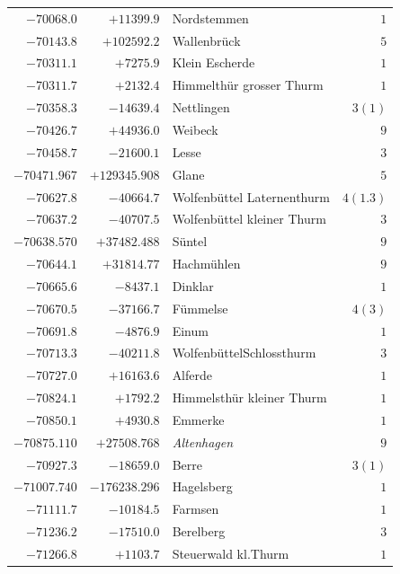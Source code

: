 \begin{center}
\begin{tabular}{r|r|p{170pt}|r}
\(-70068.0\)&\(+11399.9\)&Nordstemmen&\(1\)\\
\(-70143.8\)&\(+102592.2\)&Wallenbrück&\(5\)\\
\(-70311.1\)&\(+7275.9\)&Klein Escherde&\(1\)\\
\(-70311.7\)&\(+2132.4\)&Himmelthür grosser Thurm&\(1\)\\
\(-70358.3\)&\(-14639.4\)&Nettlingen&\(3 (1)\)\\
\(-70426.7\)&\(+44936.0\)&Weibeck&\(9\)\\
\(-70458.7\)&\(-21600.1\)&Lesse&\(3\)\\
\(-70471.967\)&\(+129345.908\)&Glane&\(5\)\\
\(-70627.8\)&\(-40664.7\)&Wolfenbüttel Laternenthurm&\(4(1.3)\)\\
\(-70637.2\)&\(-40707.5\)&Wolfenbüttel kleiner Thurm&\(3\)\\
\(-70638.570\)&\(+37482.488\)&Süntel&\(9\)\\
\(-70644.1\)&\(+31814.77\)&Hachmühlen&\(9\)\\
\(-70665.6\)&\(-8437.1\)&Dinklar&\(1\)\\
\(-70670.5\)&\(-37166.7\)&Fümmelse&\(4 (3)\)\\
\(-70691.8\)&\(-4876.9\)&Einum&\(1\)\\
\(-70713.3\)&\(-40211.8\)&WolfenbüttelSchlossthurm&\(3\)\\
\(-70727.0\)&\(+16163.6\)&Alferde&\(1\)\\
\(-70824.1\)&\(+1792.2\)&Himmelsthür kleiner Thurm&\(1\)\\
\(-70850.1\)&\(+4930.8\)&Emmerke&\(1\)\\
\(-70875.110\)&\(+27508.768\)&\textit{Altenhagen}&\(9\)\\
\(-70927.3\)&\(-18659.0\)&Berre&\(3 (1)\)\\
\(-71007.740\)&\(-176238.296\)&Hagelsberg&\(1\)\\
\(-71111.7\)&\(-10184.5\)&Farmsen&\(1\)\\
\(-71236.2\)&\(-17510.0\)&Berelberg&\(3\)\\
\(-71266.8\)&\(+1103.7\)&Steuerwald kl.Thurm&\(1\)\\
\hline\end{tabular}\endgroup\end{center}
\clearpage
